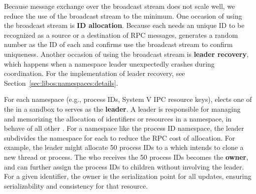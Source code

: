 Because message exchange over the broadcast stream does not scale well,
we reduce the use of the broadcast stream to the minimum.
One occasion of using the broadcast stream is
{\bf \picoproc{} ID allocation}.
Because each \picoproc{} needs an unique ID to be recognized as a source or a destination of RPC messages, \thelibos{} generates a random number as the ID of each \picoproc{} and confirms use the broadcast stream to confirm uniqueness.
Another occasion of using the broadcast stream
is {\bf leader recovery}, which happens when a namespace leader unexpectedly crashes
during coordination. For the implementation of leader recovery, see Section~\ref{sec:libos:namespaces:details}.


For each namespace (e.g., process IDs, System V IPC resource keys), \thelibos{} elects one of the \picoprocs{} in a sandbox to serves as the {\bf leader}.
A leader is responsible for
managing and memorizing the allocation of identifiers or resources in a namespace,
in behave of all other \picoprocs{}.
For a namespace like the process ID namespace,
the leader subdivides the namespace for each \picoproc{} to reduce the RPC cost of allocation.
For example, the leader might allocate 50 process IDs to a \picoproc{} which intends to clone a new thread or process.
The \picoproc{} who receives the 50 process IDs becomes the {\bf owner},
and can further assign the process IDs
to children without involving the leader.
For a given identifier, the owner is the serialization point for all updates,
ensuring serializability and consistency for that resource.

\label{sec:libos:namespaces:details}

